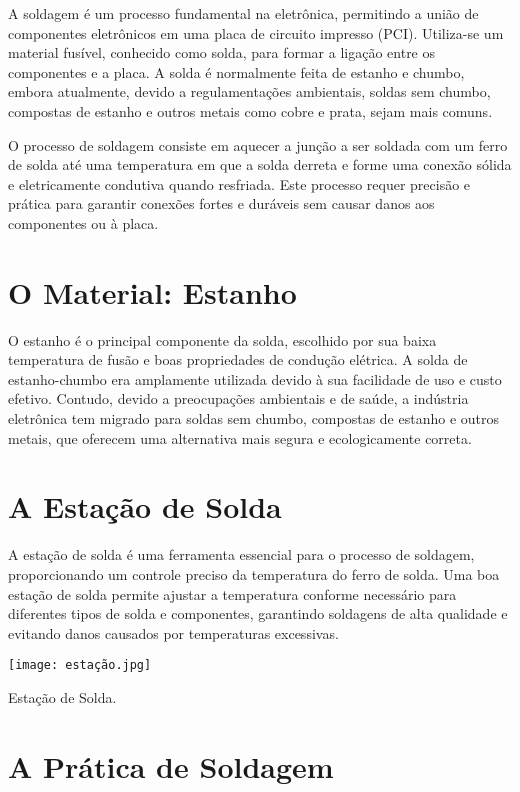 \documentclass[
]{book}
\begin{document}
A soldagem é um processo fundamental na eletrônica, permitindo a união de componentes eletrônicos em uma placa de circuito impresso (PCI). Utiliza-se um material fusível, conhecido como solda, para formar a ligação entre os componentes e a placa. A solda é normalmente feita de estanho e chumbo, embora atualmente, devido a regulamentações ambientais, soldas sem chumbo, compostas de estanho e outros metais como cobre e prata, sejam mais comuns.

O processo de soldagem consiste em aquecer a junção a ser soldada com um ferro de solda até uma temperatura em que a solda derreta e forme uma conexão sólida e eletricamente condutiva quando resfriada. Este processo requer precisão e prática para garantir conexões fortes e duráveis sem causar danos aos componentes ou à placa.

\section{O Material: Estanho}\label{o-material-estanho}

O estanho é o principal componente da solda, escolhido por sua baixa temperatura de fusão e boas propriedades de condução elétrica. A solda de estanho-chumbo era amplamente utilizada devido à sua facilidade de uso e custo efetivo. Contudo, devido a preocupações ambientais e de saúde, a indústria eletrônica tem migrado para soldas sem chumbo, compostas de estanho e outros metais, que oferecem uma alternativa mais segura e ecologicamente correta.

\section{A Estação de Solda}\label{a-estauxe7uxe3o-de-solda}

A estação de solda é uma ferramenta essencial para o processo de soldagem, proporcionando um controle preciso da temperatura do ferro de solda. Uma boa estação de solda permite ajustar a temperatura conforme necessário para diferentes tipos de solda e componentes, garantindo soldagens de alta qualidade e evitando danos causados por temperaturas excessivas.

\texttt{[image: estação.jpg]}

Estação de Solda.

\section{A Prática de Soldagem}\label{a-pruxe1tica-de-soldagem}
\end{document}
